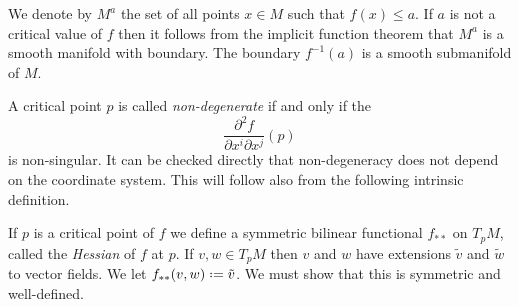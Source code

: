 We denote by \(M^a\) the set of all points \(x\in M\) such that \(f(x)\leq
a\). If \(a\) is not a critical value of \(f\) then it follows from the
implicit function theorem that \(M^a\) is a smooth manifold with
boundary. The boundary \(f^{-1}(a)\) is a smooth submanifold of \(M\).

A critical point \(p\) is called \emph{non-degenerate} if and only if the
\[
  \frac{\partial^2 f}{\partial x^i\partial x^j}(p)
\]
is non-singular. It can be checked directly that non-degeneracy does not
depend on the coordinate system. This will follow also from the following
intrinsic definition.

If \(p\) is a critical point of \(f\) we define a symmetric bilinear
functional \(f_{**}\) on \(T_pM\), called the \emph{Hessian} of \(f\) at
\(p\). If \(v,w\in T_pM\) then \(v\) and \(w\) have extensions \(\tilde v\)
and \(\tilde w\) to vector fields. We let \(f_{**}(v,w)\defeq \tilde
v\). We must show that this is symmetric and well-defined.


